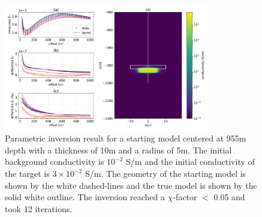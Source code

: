 \begin{figure}
    \begin{center}
    \includegraphics[width=0.8\textwidth]{figures/inversion/parametric_voxel2_dz10.png}
    \end{center}
\caption{
    Parametric inversion result for a starting model
    centered at 955m depth with a thickness of 10m and a radius of 5m. The initial background
    conductivity is $10^{-2}$ S/m and the initial conductivity of the target is $3\times10^{-2}$ S/m.
    The geometry of the starting model is shown by the white dashed-lines and the
    true model is shown by the solid white outline. The inversion reached a $\chi$-factor $<$ 0.05
    and took 12 iterations.
}
\label{fig:parametric_voxel2_dz10}
\end{figure}
